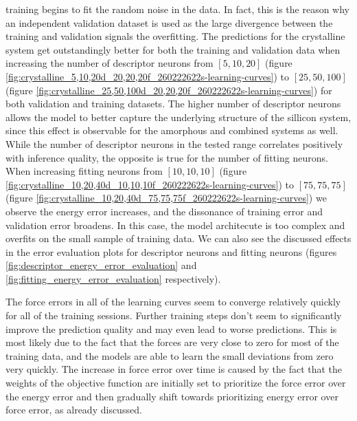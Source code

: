 training begins to fit the random noise in the data. In fact, this is the
reason why an independent validation dataset is used as the large divergence
between the training and validation signals the overfitting.
The predictions for the crystalline system get outstandingly better for both
the training and validation data when increasing the number of descriptor
neurons from $[5, 10, 20]$ (figure
\ref{fig:crystalline_5,10,20d_20,20,20f_260222622s-learning-curves}) to
$[25, 50, 100]$ (figure
\ref{fig:crystalline_25,50,100d_20,20,20f_260222622s-learning-curves}) for
both validation and training datasets. The higher number of descriptor
neurons allows the model to better capture the underlying structure of the
sillicon system, since this effect is observable for the amorphous and
combined systems as well. While the number of descriptor neurons in the tested
range correlates positively with inference quality, the opposite is true for
the number of fitting neurons. When increasing fitting neurons from
$[10, 10, 10]$
(figure \ref{fig:crystalline_10,20,40d_10,10,10f_260222622s-learning-curves})
to $[75, 75, 75]$
(figure \ref{fig:crystalline_10,20,40d_75,75,75f_260222622s-learning-curves})
we observe the energy error increases, and the dissonance of training error
and validation error broadens. In this case, the model architecute is too
complex and overfits on the small sample of training data. We can also see
the discussed effects in the error evaluation plots for descriptor neurons
and fitting neurons (figures \ref{fig:descriptor_energy_error_evaluation} and
\ref{fig:fitting_energy_error_evaluation} respectively).

The force errors in all of the learning curves seem to converge relatively
quickly for all of the training sessions. Further training steps don't seem to
significantly improve the prediction quality and may even lead to worse
predictions. This is most likely due to the fact that the forces are very
close to zero for most of the training data, and the models are able to learn
the small deviations from zero very quickly. The increase in force error over
time is caused by the fact that the weights of the objective function are
initially set to prioritize the force error over the energy error and then
gradually shift towards prioritizing energy error over force error, as already
discussed.

